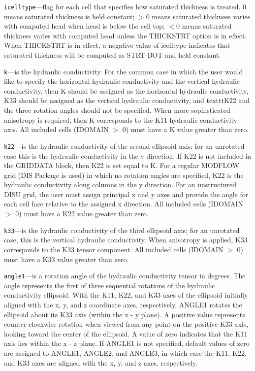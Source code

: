 \begin{description}
\item \texttt{icelltype}---flag for each cell that specifies how saturated thickness is treated.  0 means saturated thickness is held constant;  $>$0 means saturated thickness varies with computed head when head is below the cell top; $<$0 means saturated thickness varies with computed head unless the THICKSTRT option is in effect.  When THICKSTRT is in effect, a negative value of icelltype indicates that saturated thickness will be computed as STRT-BOT and held constant.

\item \texttt{k}---is the hydraulic conductivity.  For the common case in which the user would like to specify the horizontal hydraulic conductivity and the vertical hydraulic conductivity, then K should be assigned as the horizontal hydraulic conductivity, K33 should be assigned as the vertical hydraulic conductivity, and texttt{K22} and the three rotation angles should not be specified.  When more sophisticated anisotropy is required, then K corresponds to the K11 hydraulic conductivity axis.  All included cells (IDOMAIN $>$ 0) must have a K value greater than zero.

\item \texttt{k22}---is the hydraulic conductivity of the second ellipsoid axis; for an unrotated case this is the hydraulic conductivity in the y direction.  If K22 is not included in the GRIDDATA block, then K22 is set equal to K.  For a regular MODFLOW grid (DIS Package is used) in which no rotation angles are specified, K22 is the hydraulic conductivity along columns in the y direction. For an unstructured DISU grid, the user must assign principal x and y axes and provide the angle for each cell face relative to the assigned x direction.  All included cells (IDOMAIN $>$ 0) must have a K22 value greater than zero.

\item \texttt{k33}---is the hydraulic conductivity of the third ellipsoid axis; for an unrotated case, this is the vertical hydraulic conductivity.  When anisotropy is applied, K33 corresponds to the K33 tensor component.  All included cells (IDOMAIN $>$ 0) must have a K33 value greater than zero.

\item \texttt{angle1}---is a rotation angle of the hydraulic conductivity tensor in degrees. The angle represents the first of three sequential rotations of the hydraulic conductivity ellipsoid. With the K11, K22, and K33 axes of the ellipsoid initially aligned with the x, y, and z coordinate axes, respectively, ANGLE1 rotates the ellipsoid about its K33 axis (within the x - y plane). A positive value represents counter-clockwise rotation when viewed from any point on the positive K33 axis, looking toward the center of the ellipsoid. A value of zero indicates that the K11 axis lies within the x - z plane. If ANGLE1 is not specified, default values of zero are assigned to ANGLE1, ANGLE2, and ANGLE3, in which case the K11, K22, and K33 axes are aligned with the x, y, and z axes, respectively.


\end{description}
